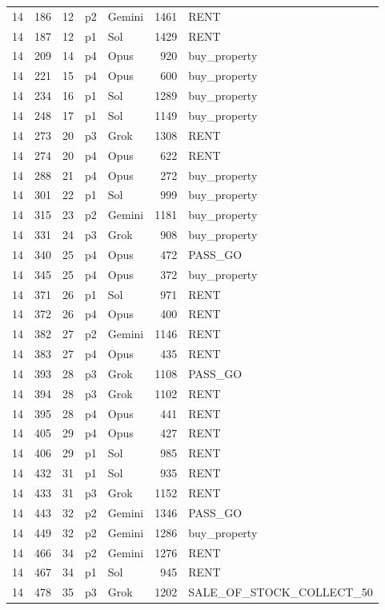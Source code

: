 \begin{longtable}{r r r l l r L{2.2in}}
14 & 186 & 12 & p2 & Gemini & 1461 & RENT \\
14 & 187 & 12 & p1 & Sol & 1429 & RENT \\
14 & 209 & 14 & p4 & Opus & 920 & buy\_property \\
14 & 221 & 15 & p4 & Opus & 600 & buy\_property \\
14 & 234 & 16 & p1 & Sol & 1289 & buy\_property \\
14 & 248 & 17 & p1 & Sol & 1149 & buy\_property \\
14 & 273 & 20 & p3 & Grok & 1308 & RENT \\
14 & 274 & 20 & p4 & Opus & 622 & RENT \\
14 & 288 & 21 & p4 & Opus & 272 & buy\_property \\
14 & 301 & 22 & p1 & Sol & 999 & buy\_property \\
14 & 315 & 23 & p2 & Gemini & 1181 & buy\_property \\
14 & 331 & 24 & p3 & Grok & 908 & buy\_property \\
14 & 340 & 25 & p4 & Opus & 472 & PASS\_GO \\
14 & 345 & 25 & p4 & Opus & 372 & buy\_property \\
14 & 371 & 26 & p1 & Sol & 971 & RENT \\
14 & 372 & 26 & p4 & Opus & 400 & RENT \\
14 & 382 & 27 & p2 & Gemini & 1146 & RENT \\
14 & 383 & 27 & p4 & Opus & 435 & RENT \\
14 & 393 & 28 & p3 & Grok & 1108 & PASS\_GO \\
14 & 394 & 28 & p3 & Grok & 1102 & RENT \\
14 & 395 & 28 & p4 & Opus & 441 & RENT \\
14 & 405 & 29 & p4 & Opus & 427 & RENT \\
14 & 406 & 29 & p1 & Sol & 985 & RENT \\
14 & 432 & 31 & p1 & Sol & 935 & RENT \\
14 & 433 & 31 & p3 & Grok & 1152 & RENT \\
14 & 443 & 32 & p2 & Gemini & 1346 & PASS\_GO \\
14 & 449 & 32 & p2 & Gemini & 1286 & buy\_property \\
14 & 466 & 34 & p2 & Gemini & 1276 & RENT \\
14 & 467 & 34 & p1 & Sol & 945 & RENT \\
14 & 478 & 35 & p3 & Grok & 1202 & SALE\_OF\_STOCK\_COLLECT\_50 \\

\end{longtable}
